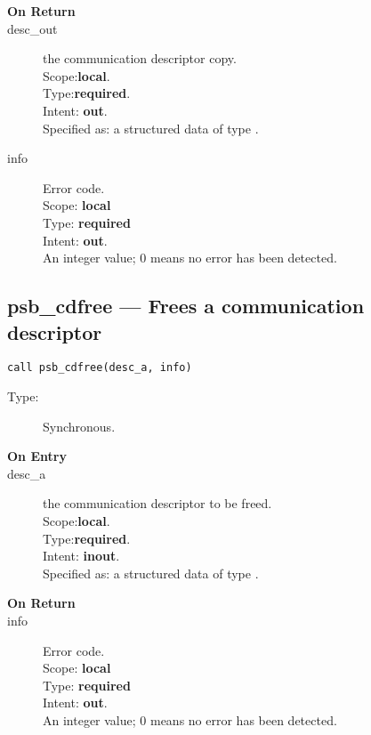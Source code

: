 \begin{description}
\item[\bf On Return]
\item[desc\_out] the communication descriptor copy.\\
Scope:{\bf local}.\\
Type:{\bf required}.\\
Intent: {\bf out}.\\
Specified as: a structured data of type \descdata.
\item[info] Error code.\\
Scope: {\bf local} \\
Type: {\bf required} \\
Intent: {\bf out}.\\
An integer value; 0 means no error has been detected. 
\end{description}


%
%
\clearpage\subsection*{psb\_cdfree --- Frees a communication descriptor}

\begin{verbatim}
call psb_cdfree(desc_a, info)
\end{verbatim}

\begin{description}
\item[Type:] Synchronous.
\item[\bf On Entry]
\item[desc\_a] the communication descriptor to be freed.\\
Scope:{\bf local}.\\
Type:{\bf required}.\\
Intent: {\bf inout}.\\
Specified as: a structured data of type \descdata.
\end{description}

\begin{description}
\item[\bf On Return]
\item[info] Error code.\\
Scope: {\bf local} \\
Type: {\bf required} \\
Intent: {\bf out}.\\
An integer value; 0 means no error has been detected. 
\end{description}




